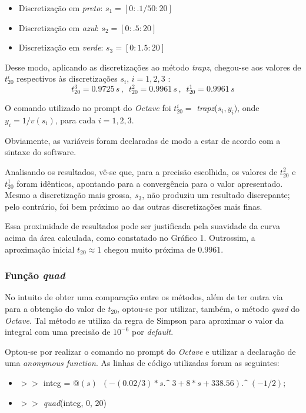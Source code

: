 \documentclass[a4paper, 12pt]{article}
\begin{document}
	\begin{itemize}
		\item Discretização em \textit{preto}: $s_1=[0:.1/50:20]$
		\item Discretização em \textit{azul}: $s_2=[0:.5:20]$
		\item Discretização em \textit{verde}: $s_3=[0:1.5:20]$
	\end{itemize}
	
	Desse modo, aplicando as discretizações ao método \textit{trapz}, chegou-se aos valores de $t_{20}^i$ respectivos às
	discretizações $s_i$, $i=1,2,3$ : $$t_{20}^3=0.9725\,s\,,\,\,\,t_{20}^2=0.9961\,s\,,\,\,\,t_{20}^1=0.9961\,s$$
	
	O comando utilizado no prompt do \textit{Octave} foi $t_{20}^i=$ \textit{trapz}($s_i,y_i$), onde $y_i=1/v(s_i)$,
	para cada $i=1,2,3$.
	
	Obviamente, as variáveis foram declaradas de modo a estar de acordo com a sintaxe do software.
	
	Analisando os resultados, vê-se que, para a precisão escolhida, os valores de $t_{20}^2$ e $t_{20}^1$ foram idênticos,
	apontando para a convergência para o valor apresentado. Mesmo a discretização mais grossa, $s_3$, não produziu um 
	resultado discrepante; pelo contrário, foi bem próximo ao das outras discretizações mais finas.
	
	Essa proximidade de resultados pode ser justificada pela suavidade da curva acima da área calculada, como constatado no
	Gráfico 1. Outrossim, a aproximação inicial $t_{20}\approx 1$ chegou muito próxima de $0.9961$.	
	 
	\subsubsection{Função \textit{quad}}
	
	No intuito de obter uma comparação entre os métodos, além de ter outra via para a obtenção do valor de $t_{20}$,
	optou-se por utilizar, também, o método \textit{quad} do \textit{Octave}. Tal método se utiliza da regra de Simpson para
	aproximar o valor da integral com uma precisão de $10^{-6}$ por \textit{default}.
	
	Optou-se por realizar o comando no prompt do \textit{Octave} e utilizar a declaração de uma \textit{anonymous function}. 
	As linhas de código utilizadas foram as seguintes:	
	
	\begin{itemize}
		 \item $>>$ integ = @$(s)\,\,\,(-(0.02/3)*s.\^\ 3+8*s+338.56).\^\ (-1/2);$		 
		 \item $>>$ \textit{quad}(integ, $0$, $20$)
	\end{itemize}
	
\end{document}
